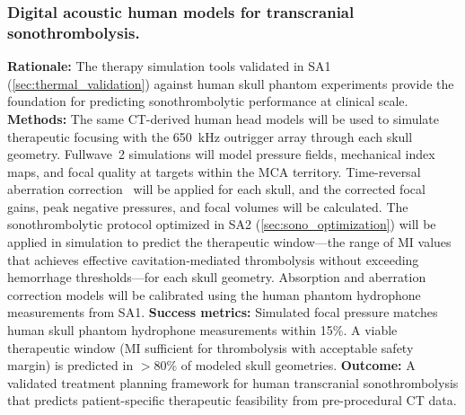 \subsubsection{Digital acoustic human models for transcranial sonothrombolysis.\label{sec:digital_therapy}}
\textbf{Rationale:} The therapy simulation tools validated in SA1 (\ref{sec:thermal_validation}) against human skull phantom experiments provide the foundation for predicting sonothrombolytic performance at clinical scale. \textbf{Methods:} The same CT-derived human head models will be used to simulate therapeutic focusing with the 650~kHz outrigger array through each skull geometry. Fullwave~2 simulations will model pressure fields, mechanical index maps, and focal quality at targets within the MCA territory. Time-reversal aberration correction~\cite{fink1992time,pinton2009phase,tanter1998focusing} will be applied for each skull, and the corrected focal gains, peak negative pressures, and focal volumes will be calculated. The sonothrombolytic protocol optimized in SA2 (\ref{sec:sono_optimization}) will be applied in simulation to predict the therapeutic window---the range of MI values that achieves effective cavitation-mediated thrombolysis without exceeding hemorrhage thresholds---for each skull geometry. Absorption and aberration correction models will be calibrated using the human phantom hydrophone measurements from SA1. \textbf{Success metrics:} Simulated focal pressure matches human skull phantom hydrophone measurements within 15\%. A viable therapeutic window (MI sufficient for thrombolysis with acceptable safety margin) is predicted in $>$80\% of modeled skull geometries. \textbf{Outcome:} A validated treatment planning framework for human transcranial sonothrombolysis that predicts patient-specific therapeutic feasibility from pre-procedural CT data.

